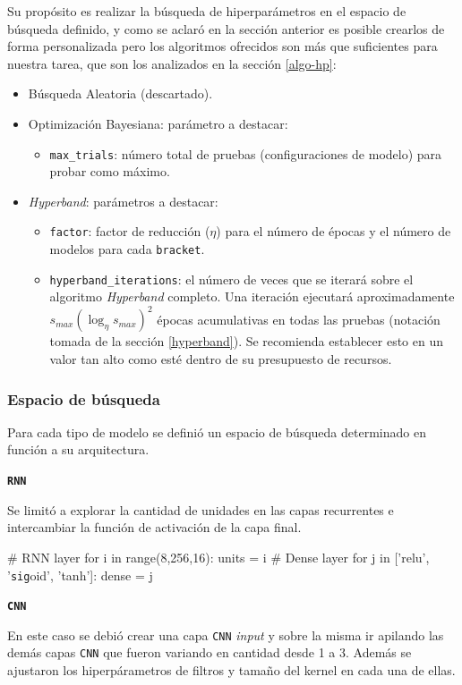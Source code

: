 \documentclass[a4paper,12pt]{article}
\begin{document}
Su propósito es realizar la búsqueda de hiperparámetros en el espacio de búsqueda definido, y como se aclaró en la sección anterior es posible crearlos de forma personalizada pero los algoritmos ofrecidos son más que suficientes para nuestra tarea, que son los analizados en la sección \ref{algo-hp}:
\begin{itemize}
	\item Búsqueda Aleatoria (descartado).
	\item Optimización Bayesiana: parámetro a destacar:
	\begin{itemize}
		\item \texttt{max\_trials}: número total de pruebas (configuraciones de modelo) para probar como máximo.
	\end{itemize}
	\item \textit{Hyperband}: parámetros a destacar:
	\begin{itemize}
		\item \texttt{factor}: factor de reducción ($\eta$) para el número de épocas y el número de modelos para cada \texttt{bracket}.
		\item \texttt{hyperband\_iterations}: el número de veces que se iterará sobre el algoritmo \textit{Hyperband} completo. Una iteración ejecutará aproximadamente $s_{max}(\log_{\eta} s_{max})^2$ épocas acumulativas en todas las pruebas (notación tomada de la sección \ref{hyperband}). Se recomienda establecer esto en un valor tan alto como esté dentro de su presupuesto de recursos.
	\end{itemize}
\end{itemize}

\subsubsection{Espacio de búsqueda}
Para cada tipo de modelo se definió un espacio de búsqueda determinado en función a su arquitectura.

\textbf{\texttt{RNN}}

Se limitó a explorar la cantidad de unidades en las capas recurrentes e intercambiar la función de activación de la capa final.

\begin{python}
# RNN layer
for i in range(8,256,16):
	units = i
# Dense layer
for j in ['relu', '\texttt{sig}oid', 'tanh']:
		dense = j
\end{python}

\textbf{\texttt{CNN}}

En este caso se debió crear una capa \texttt{CNN} \textit{input} y sobre la misma ir apilando las demás capas \texttt{CNN} que fueron variando en cantidad desde 1 a 3.
Además se ajustaron los hiperpárametros de filtros y tamaño del kernel en cada una de ellas.
 
\end{document}
